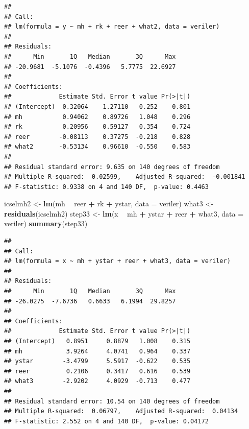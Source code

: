 \documentclass[]{article}
\newenvironment{Shaded}{\begin{snugshade}}{\end{snugshade}}
\newcommand{\KeywordTok}[1]{\textcolor[rgb]{0.13,0.29,0.53}{\textbf{#1}}}
\newcommand{\DataTypeTok}[1]{\textcolor[rgb]{0.13,0.29,0.53}{#1}}
\newcommand{\StringTok}[1]{\textcolor[rgb]{0.31,0.60,0.02}{#1}}
\newcommand{\OperatorTok}[1]{\textcolor[rgb]{0.81,0.36,0.00}{\textbf{#1}}}
\newcommand{\NormalTok}[1]{#1}
\begin{document}
\begin{verbatim}
## 
## Call:
## lm(formula = y ~ mh + rk + reer + what2, data = veriler)
## 
## Residuals:
##      Min       1Q   Median       3Q      Max 
## -20.9681  -5.1076  -0.4396   5.7775  22.6927 
## 
## Coefficients:
##             Estimate Std. Error t value Pr(>|t|)
## (Intercept)  0.32064    1.27110   0.252    0.801
## mh           0.94062    0.89726   1.048    0.296
## rk           0.20956    0.59127   0.354    0.724
## reer        -0.08113    0.37275  -0.218    0.828
## what2       -0.53134    0.96610  -0.550    0.583
## 
## Residual standard error: 9.635 on 140 degrees of freedom
## Multiple R-squared:  0.02599,    Adjusted R-squared:  -0.001841 
## F-statistic: 0.9338 on 4 and 140 DF,  p-value: 0.4463
\end{verbatim}

\begin{Shaded}
\begin{Highlighting}[]
\NormalTok{icselmh2 <-}\StringTok{ }\KeywordTok{lm}\NormalTok{(mh }\OperatorTok{~}\StringTok{ }\NormalTok{reer }\OperatorTok{+}\StringTok{ }\NormalTok{rk }\OperatorTok{+}\StringTok{ }\NormalTok{ystar, }\DataTypeTok{data =}\NormalTok{ veriler)}
\NormalTok{what3 <-}\StringTok{ }\KeywordTok{residuals}\NormalTok{(icselmh2)}
\NormalTok{step33 <-}\StringTok{ }\KeywordTok{lm}\NormalTok{(x }\OperatorTok{~}\StringTok{ }\NormalTok{mh }\OperatorTok{+}\StringTok{ }\NormalTok{ystar }\OperatorTok{+}\StringTok{ }\NormalTok{reer }\OperatorTok{+}\StringTok{ }\NormalTok{what3, }\DataTypeTok{data =}\NormalTok{ veriler)}
\KeywordTok{summary}\NormalTok{(step33)}
\end{Highlighting}
\end{Shaded}

\begin{verbatim}
## 
## Call:
## lm(formula = x ~ mh + ystar + reer + what3, data = veriler)
## 
## Residuals:
##      Min       1Q   Median       3Q      Max 
## -26.0275  -7.6736   0.6633   6.1994  29.8257 
## 
## Coefficients:
##             Estimate Std. Error t value Pr(>|t|)
## (Intercept)   0.8951     0.8879   1.008    0.315
## mh            3.9264     4.0741   0.964    0.337
## ystar        -3.4799     5.5917  -0.622    0.535
## reer          0.2106     0.3417   0.616    0.539
## what3        -2.9202     4.0929  -0.713    0.477
## 
## Residual standard error: 10.54 on 140 degrees of freedom
## Multiple R-squared:  0.06797,    Adjusted R-squared:  0.04134 
## F-statistic: 2.552 on 4 and 140 DF,  p-value: 0.04172
\end{verbatim}
\end{document}
